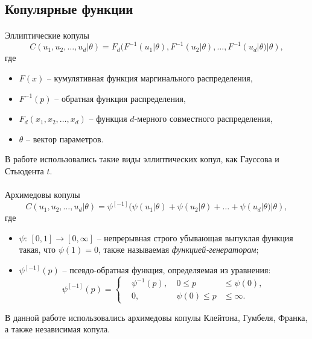 \documentclass[aspectratio=169]{beamer}
\begin{document}
\subsection{Копулярные функции}

\begin{frame}{\insertsection}
    \framesubtitle{\insertsubsection}
    \begin{block}{Эллиптические копулы}
        \begin{equation}
            C(u_1, u_2, \ldots, u_d | \theta) = F_d(F^{-1}(u_1 | \theta), F^{-1}(u_2 | \theta), \ldots, F^{-1}(u_d | \theta) | \theta),
        \end{equation}
        где
        \begin{itemize}
            \item $F(x)$ -- кумулятивная функция маргинального распределения, 
            \item $F^{-1}(p)$ -- обратная функция распределения, 
            \item $F_d(x_1, x_2, \dots, x_d)$ -- функция $d$-мерного совместного распределения, 
            \item $\theta$ -- вектор параметров.
        \end{itemize}
        В работе использовались такие виды эллиптических копул, как Гауссова и Стьюдента $t$.
    \end{block}
\end{frame}

\begin{frame}{\insertsection}
    \framesubtitle{\insertsubsection}
    \begin{block}{Архимедовы копулы}
        \begin{equation}
            C(u_1,u_2,\ldots,u_d|\theta) = \psi^{[-1]}(\psi(u_1|\theta)+\psi(u_2|\theta) + \ldots + \psi(u_d|\theta) | \theta ),
        \end{equation}
        где
        \begin{itemize}
            \item $\psi$: $[0,1] \rightarrow [0, \infty]$ -- непрерывная строго убывающая выпуклая функция такая, что $\psi(1) = 0$, также называемая \textit{функцией-генератором};
            \item $\psi^{[-1]}(p)$ -- псевдо-обратная функция, определяемая из уравнения:
            $$\psi^{[-1]}(p) = \left\{ \begin{aligned}
                & \psi^{-1}(p), & \ 0 \le p & \le \psi(0), \\
                & 0,            & \ \psi(0) \le p & \le \infty.
            \end{aligned} \right.$$
        \end{itemize}
        В данной работе использовались архимедовы копулы Клейтона, Гумбеля, Франка, а также независимая копула.
    \end{block}
\end{frame}
\end{document}

